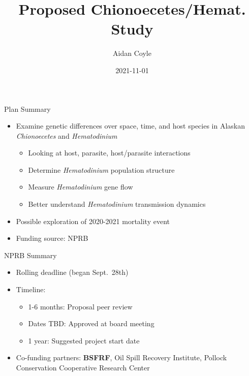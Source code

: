 \documentclass[
  ignorenonframetext,
]{beamer}
\title{Proposed Chionoecetes/Hemat. Study}
\author{Aidan Coyle}
\date{2021-11-01}
\providecommand{\tightlist}{%
  \setlength{\itemsep}{0pt}\setlength{\parskip}{0pt}}
\begin{document}
\frame{\titlepage}

\begin{frame}{Plan Summary}
\protect\hypertarget{plan-summary}{}
\begin{itemize}
\item
  Examine genetic differences over space, time, and host species in
  Alaskan \emph{Chionoecetes} and \emph{Hematodinium}

  \begin{itemize}
  \tightlist
  \item
    Looking at host, parasite, host/parasite interactions
  \item
    Determine \emph{Hematodinium} population structure
  \item
    Measure \emph{Hematodinium} gene flow
  \item
    Better understand \emph{Hematodinium} transmission dynamics
  \end{itemize}
\item
  Possible exploration of 2020-2021 mortality event
\item
  Funding source: NPRB
\end{itemize}
\end{frame}

\begin{frame}{NPRB Summary}
\protect\hypertarget{nprb-summary}{}
\begin{itemize}
\item
  Rolling deadline (began Sept.~28th)
\item
  Timeline:

  \begin{itemize}
  \tightlist
  \item
    1-6 months: Proposal peer review
  \item
    Dates TBD: Approved at board meeting
  \item
    1 year: Suggested project start date
  \end{itemize}
\item
  Co-funding partners: \textbf{BSFRF}, Oil Spill Recovery Institute,
  Pollock Conservation Cooperative Research Center
\end{itemize}
\end{frame}
\end{document}
